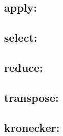 \subsection{{\sf apply}: }

\subsection{{\sf select}: }

\subsection{{\sf reduce}: }

\subsection{{\sf transpose}: }

\subsection{{\sf kronecker}: }
